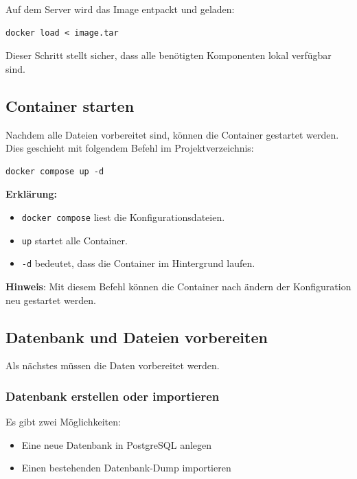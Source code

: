 Auf dem Server wird das Image entpackt und geladen:

\begin{verbatim}
docker load < image.tar
\end{verbatim}

Dieser Schritt stellt sicher, dass alle benötigten Komponenten lokal verfügbar sind.

\subsection{Container starten}
\label{subsection:run-containers}

Nachdem alle Dateien vorbereitet sind, können die Container gestartet werden. Dies geschieht mit
folgendem Befehl im Projektverzeichnis:

\begin{verbatim}
docker compose up -d
\end{verbatim}

\textbf{Erklärung:}
\begin{itemize}
    \item \texttt{docker compose} liest die Konfigurationsdateien.
    \item \texttt{up} startet alle Container.
    \item \texttt{-d} bedeutet, dass die Container im Hintergrund laufen.
\end{itemize}

\textbf{Hinweis}: Mit diesem Befehl können die Container nach ändern der Konfiguration neu gestartet
werden.

\subsection{Datenbank und Dateien vorbereiten}

Als nächstes müssen die Daten vorbereitet werden.

\subsubsection{Datenbank erstellen oder importieren}

Es gibt zwei Möglichkeiten:
\begin{itemize}
    \item Eine neue Datenbank in PostgreSQL anlegen
    \item Einen bestehenden Datenbank-Dump importieren
\end{itemize}

